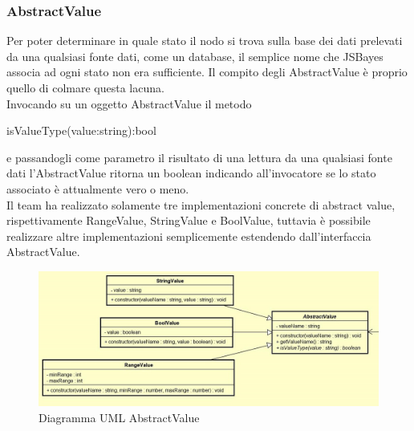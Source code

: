 \subsubsection{AbstractValue}
Per poter determinare in quale stato il nodo si trova sulla base dei dati prelevati da una qualsiasi fonte dati, come un database, il semplice nome che JSBayes associa ad ogni stato non era sufficiente. Il compito degli AbstractValue è proprio quello di colmare questa lacuna.\\
Invocando su un oggetto AbstractValue il metodo
\begin{ttfamily}
	isValueType(value:string):bool
\end{ttfamily}
e passandogli come parametro il risultato di una lettura da una qualsiasi fonte dati l'AbstractValue ritorna un boolean indicando all'invocatore se lo stato associato è attualmente vero o meno.\\
Il team ha realizzato solamente tre implementazioni concrete di abstract value, rispettivamente RangeValue, StringValue e BoolValue, tuttavia è possibile realizzare altre implementazioni semplicemente estendendo dall'interfaccia AbstractValue.
\begin{figure} [H]
	\centering
	\includegraphics[scale=0.55]{Img/AbstractValue}
	\caption{Diagramma UML AbstractValue}\label{}
\end{figure}
